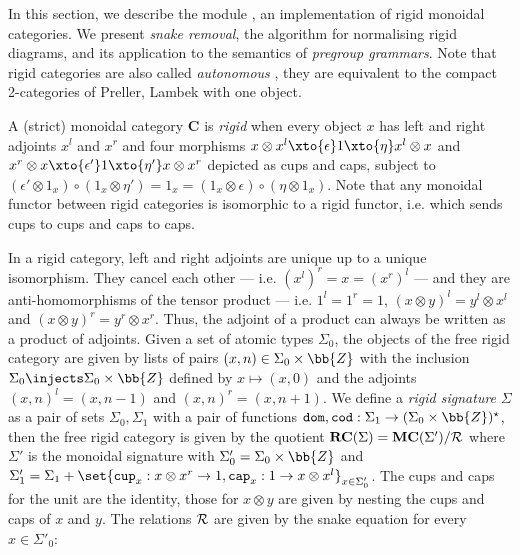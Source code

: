 
In this section, we describe the module , an implementation of
rigid monoidal categories.
We present \emph{snake removal}, the algorithm for normalising rigid diagrams, and its application to the semantics of \emph{pregroup grammars}.
Note that rigid categories are also called \emph{autonomous} \cite{JoyalStreet88,Delpeuch14a}, they are equivalent to the compact 2-categories of Preller, Lambek \cite{PrellerLambek07} with one object.

A (strict) monoidal category $\mathbf{C}$ is \emph{rigid} when every object $x$
has left and right adjoints $x^l$ and $x^r$ and four morphisms
$x \otimes x^l \xto{\epsilon} 1 \xto{\eta} x^l \otimes x$ and
$x^r \otimes x \xto{\epsilon'} 1 \xto{\eta'} x \otimes x^r$ depicted as cups and caps,
subject to $(\epsilon' \otimes 1_x) \circ (1_x \otimes \eta') = 1_x = (1_x \otimes \epsilon) \circ (\eta \otimes 1_x)$.
Note that any monoidal functor between rigid categories is isomorphic to a rigid functor, i.e. which sends cups to cups and caps to caps.

In a rigid category, left and right adjoints are unique up to a unique isomorphism.
They cancel each other --- i.e. $(x^l)^r = x = (x^r)^l$ --- and they are anti-homomorphisms of the tensor product --- i.e. $1^l = 1^r = 1$, $(x \otimes y)^l = y^l \otimes x^l$ and $(x \otimes y)^r = y^r \otimes x^r$.
Thus, the adjoint of a product can always be written as a product of adjoints.
Given a set of atomic types $\Sigma_0$, the objects of the free rigid category are given by lists of pairs $(x, n) \in \Sigma_0 \times \bb{Z}$ with the inclusion $\Sigma_0 \injects \Sigma_0 \times \bb{Z}$ defined by $x \mapsto (x, 0)$ and the adjoints $(x, n)^l = (x, n - 1)$ and $(x, n)^r = (x, n + 1)$.
We define a \emph{rigid signature} $\Sigma$ as a pair of sets $\Sigma_0, \Sigma_1$ with a pair of functions $\mathtt{dom}, \mathtt{cod} : \Sigma_1 \to (\Sigma_0 \times \bb{Z})^\star$,
then the free rigid category is given by the quotient $\mathbf{RC}(\Sigma) = \mathbf{MC}(\Sigma') / \cal{R}$
where $\Sigma'$ is the monoidal signature with $\Sigma'_0 = \Sigma_0 \times \bb{Z}$ and $\Sigma'_1 = \Sigma_1 + \set{\mathtt{cup}_x : x \otimes x^r \to 1, \mathtt{cap}_x : 1 \to x \otimes x^l}_{x \in \Sigma'_0}$.
The cups and caps for the unit are the identity, those for $x \otimes y$ are given by nesting the cups and caps of $x$ and $y$.
The relations $\cal{R}$ are given by the snake equation for every $x \in \Sigma'_0$:
\begin{center}

\end{center}

